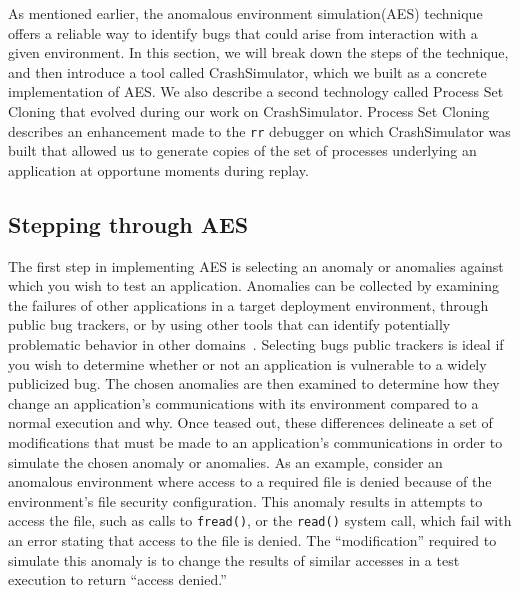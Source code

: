 As mentioned earlier,
the anomalous environment simulation(AES) technique
offers a reliable way to identify bugs
that could arise from interaction with a given environment.
In this section,
we will break down the steps of the technique,
and then introduce a tool called CrashSimulator,
which we built as a concrete implementation of AES.
We also describe a second technology
called Process Set Cloning
that evolved during our work on CrashSimulator.
Process Set Cloning describes an enhancement made to
the {\tt rr} debugger on which CrashSimulator was built
that allowed us to generate copies of the set of processes underlying an
application at opportune moments during replay.


\subsection{Stepping through AES}

The first step in implementing AES
is selecting an anomaly or anomalies
against which you wish to test an application.
Anomalies can be collected
by examining the failures of other applications
in a target deployment environment,
through public bug trackers,
or by using other tools that can identify
potentially problematic behavior in other domains~\cite{Zhuang_NSDI_2014,
rasley2015detecting}.
Selecting bugs public trackers
is ideal if you wish to determine
whether or not an application
is vulnerable to a widely publicized bug.
The chosen anomalies are then examined
to determine how they change an application's communications
with its environment
compared to a normal execution and why.
Once teased out,
these differences delineate
a set of modifications
that must be made to an application's communications
in order to simulate the chosen anomaly or anomalies.
As an example,
consider an anomalous environment
where access to a required file is denied because of
the environment's file security configuration.
This anomaly results in attempts to access the file,
such as calls to {\tt fread()},
or the {\tt read()} system call,
which fail with an error stating that access to the file is denied.
The ``modification'' required to simulate this anomaly
is to change the results of similar accesses
in a test execution
to return ``access denied.''

